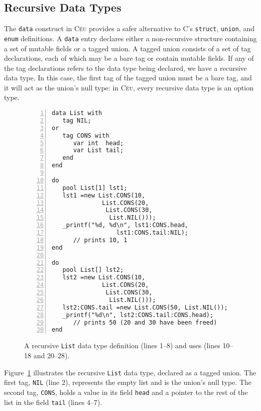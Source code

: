 \documentclass{acm_proc_article-sp}
\newcommand{\CEU}{\textsc{C\'{e}u}\xspace}
\newcommand{\code}[1] {{\small{\texttt{#1}}}}
\begin{document}
\subsection{Recursive Data Types}

The \code{data} construct in \CEU provides a safer alternative to C's
\code{struct}, \code{union}, and \code{enum} definitions. A \code{data} entry
declares either a non-recursive structure containing a set of mutable fields
or a tagged union. A tagged union consists of a set of tag declarations, each
of which may be a bare tag or contain mutable fields. If any of the tag
declarations refers to the data type being declared, we have a recursive data
type. In this case, the first tag of the tagged union must be a bare tag, and
it will act as the union's null type: in \CEU, every recursive data type
is an option type.

%
%
%
%
%

\begin{figure}[t]
\begin{lstlisting}[numbers=left,xleftmargin=3em]
data List with
   tag NIL;
or
   tag CONS with
      var int  head;
      var List tail;
   end
end

do
   pool List[1] lst1;
   lst1 =new List.CONS(10,
              List.CONS(20,
               List.CONS(30,
                List.NIL()));
   _printf("%d, %d\n", lst1:CONS.head,
                  lst1:CONS.tail:NIL);
      // prints 10, 1
end

do
   pool List[] lst2;
   lst2 =new List.CONS(10,
              List.CONS(20,
               List.CONS(30,
                List.NIL()));
   lst2:CONS.tail =new List.CONS(50, List.NIL());
   _printf("%d\n", lst2:CONS.tail:CONS.head);
      // prints 50 (20 and 30 have been freed)
end
\end{lstlisting}
\caption{
A recursive \code{List} data type definition (lines 1--8) and uses (lines 
10--18 and 20--28).
\label{lst.list}
}
\end{figure}

Figure~\ref{lst.list} illustrates the recursive \code{List} data type,
declared as a tagged union. The first tag, \code{NIL} (line 2), represents
the empty list and is the union's null type. The second tag, \code{CONS},
holds a value in its field \code{head} and a pointer to the rest of the list
in the field \code{tail} (lines 4--7).
\end{document}
